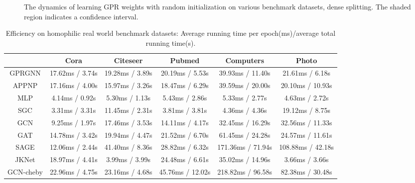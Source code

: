 \documentclass{article} \usepackage{iclr2021_conference,times}
\begin{document}
\begin{figure*}[ht]
  \\
  \\
  \caption{ The dynamics of learning GPR weights with random initialization on various benchmark datasets, dense splitting. The shaded region indicates a  confidence interval. }\label{fig:GPRweights_fulldym}
\end{figure*}

\begin{table}[ht]
\caption{Efficiency on homophilic real world benchmark datasets: Average running time per epoch(ms)/average total running time(s).}
\small
\begin{tabular}{@{}cccccc@{}}
\toprule
       & Cora            & Citeseer        & Pubmed          & Computers         & Photo           \\ \midrule
GPRGNN & 17.62ms / 3.74s & 19.28ms / 3.89s & 20.19ms / 5.53s & 39.93ms / 11.40s  & 21.61ms / 6.18s   \\
APPNP  & 17.16ms / 4.00s & 15.97ms / 3.26s & 18.47ms / 6.29s & 39.59ms / 20.00s  & 20.10ms / 10.93s  \\
MLP    & 4.14ms / 0.92s  & 5.30ms / 1.13s    & 5.43ms / 2.86s  & 5.33ms / 2.77s    & 4.63ms / 2.72s    \\
SGC    & 3.31ms / 3.31s  & 11.45ms / 2.31s   & 3.81ms / 3.81s  & 4.36ms / 4.36s    & 19.12ms / 8.75s   \\
GCN    & 9.25ms / 1.97s  & 17.46ms / 3.53s   & 14.11ms / 4.17s & 32.45ms / 16.29s  & 32.56ms / 11.33s  \\
GAT    & 14.78ms / 3.42s & 19.94ms / 4.47s   & 21.52ms / 6.70s & 61.45ms / 24.28s  & 24.57ms / 11.61s  \\
SAGE   & 12.06ms / 2.44s & 41.40ms / 8.36s   & 28.82ms / 6.32s & 171.36ms / 71.94s & 108.88ms / 42.18s \\
JKNet  & 18.97ms / 4.41s & 3.99ms / 3.99s    & 24.48ms / 6.61s & 35.02ms / 14.96s  & 3.66ms / 3.66s    \\
GCN-cheby & 22.96ms / 4.75s & 23.16ms / 4.68s & 45.76ms / 12.02s & 218.82ms / 96.58s & 82.38ms / 30.48s \\ \bottomrule
\end{tabular}
\normalsize
\end{table}
\end{document}

